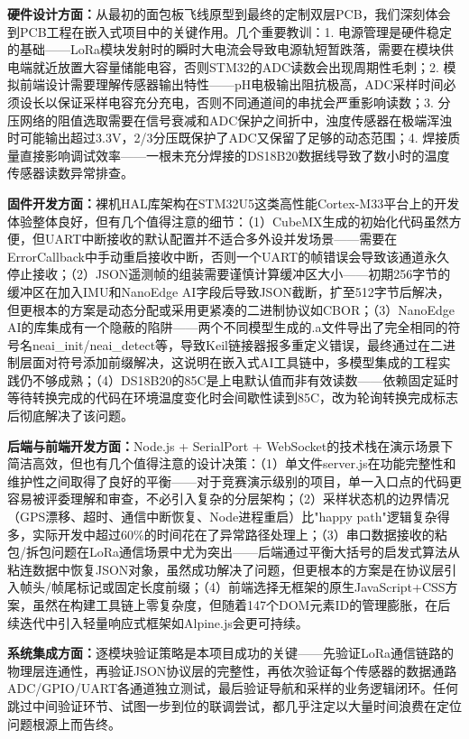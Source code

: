 \documentclass[12pt,a4paper]{ctexart}
\begin{document}
\textbf{硬件设计方面：}从最初的面包板飞线原型到最终的定制双层PCB，我们深刻体会到PCB工程在嵌入式项目中的关键作用。几个重要教训：1. 电源管理是硬件稳定的基础——LoRa模块发射时的瞬时大电流会导致电源轨短暂跌落，需要在模块供电端就近放置大容量储能电容，否则STM32的ADC读数会出现周期性毛刺；2. 模拟前端设计需要理解传感器输出特性——pH电极输出阻抗极高，ADC采样时间必须设长以保证采样电容充分充电，否则不同通道间的串扰会严重影响读数；3. 分压网络的阻值选取需要在信号衰减和ADC保护之间折中，浊度传感器在极端浑浊时可能输出超过3.3V，2/3分压既保护了ADC又保留了足够的动态范围；4. 焊接质量直接影响调试效率——一根未充分焊接的DS18B20数据线导致了数小时的温度传感器读数异常排查。

\textbf{固件开发方面：}裸机HAL库架构在STM32U5这类高性能Cortex-M33平台上的开发体验整体良好，但有几个值得注意的细节：（1）CubeMX生成的初始化代码虽然方便，但UART中断接收的默认配置并不适合多外设并发场景——需要在ErrorCallback中手动重启接收中断，否则一个UART的帧错误会导致该通道永久停止接收；（2）JSON遥测帧的组装需要谨慎计算缓冲区大小——初期256字节的缓冲区在加入IMU和NanoEdge AI字段后导致JSON截断，扩至512字节后解决，但更根本的方案是动态分配或采用更紧凑的二进制协议如CBOR；（3）NanoEdge AI的库集成有一个隐蔽的陷阱——两个不同模型生成的.a文件导出了完全相同的符号名neai\_init/neai\_detect等，导致Keil链接器报多重定义错误，最终通过在二进制层面对符号添加前缀解决，这说明在嵌入式AI工具链中，多模型集成的工程实践仍不够成熟；（4）DS18B20的85\textdegree C是上电默认值而非有效读数——依赖固定延时等待转换完成的代码在环境温度变化时会间歇性读到85\textdegree C，改为轮询转换完成标志后彻底解决了该问题。

\textbf{后端与前端开发方面：}Node.js + SerialPort + WebSocket的技术栈在演示场景下简洁高效，但也有几个值得注意的设计决策：（1）单文件server.js在功能完整性和维护性之间取得了良好的平衡——对于竞赛演示级别的项目，单一入口点的代码更容易被评委理解和审查，不必引入复杂的分层架构；（2）采样状态机的边界情况（GPS漂移、超时、通信中断恢复、Node进程重启）比"happy path"逻辑复杂得多，实际开发中超过60\%的时间花在了异常路径处理上；（3）串口数据接收的粘包/拆包问题在LoRa通信场景中尤为突出——后端通过平衡大括号的启发式算法从粘连数据中恢复JSON对象，虽然成功解决了问题，但更根本的方案是在协议层引入帧头/帧尾标记或固定长度前缀；（4）前端选择无框架的原生JavaScript+CSS方案，虽然在构建工具链上零复杂度，但随着147个DOM元素ID的管理膨胀，在后续迭代中引入轻量响应式框架如Alpine.js会更可持续。

\textbf{系统集成方面：}逐模块验证策略是本项目成功的关键——先验证LoRa通信链路的物理层连通性，再验证JSON协议层的完整性，再依次验证每个传感器的数据通路ADC/GPIO/UART各通道独立测试，最后验证导航和采样的业务逻辑闭环。任何跳过中间验证环节、试图一步到位的联调尝试，都几乎注定以大量时间浪费在定位问题根源上而告终。
\end{document}
